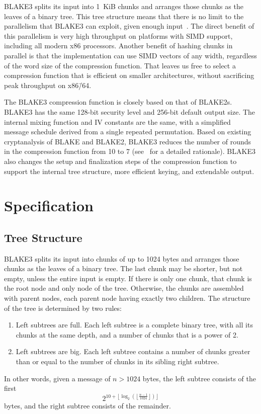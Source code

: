 \documentclass[11pt,notitlepage,a4paper]{article}
\begin{document}
BLAKE3 splits its input into 1~KiB chunks and arranges those chunks as the
leaves of a binary tree. This tree structure means that there is no limit to
the parallelism that BLAKE3 can exploit, given enough
input~\cite{DBLP:journals/tosc/AtighehchiB17,DBLP:journals/tc/AtighehchiR17}.
The direct benefit of this parallelism is very high throughput on platforms
with SIMD support, including all modern x86 processors. Another benefit of
hashing chunks in parallel is that the implementation can use SIMD vectors of
any width, regardless of the word size of the compression function. That leaves
us free to select a compression function that is efficient on smaller
architectures, without sacrificing peak throughput on x86\=/64.

The BLAKE3 compression function is closely based on that of BLAKE2s. BLAKE3 has
the same 128-bit security level and 256-bit default output size. The internal
mixing function and IV constants are the same, with a simplified message
schedule derived from a single repeated permutation. Based on existing
cryptanalysis of BLAKE and BLAKE2, BLAKE3 reduces the number of rounds in the
compression function from 10 to 7 (see~\cite{TMC} for a detailed rationale).
BLAKE3 also changes the setup and finalization steps of the compression
function to support the internal tree structure, more efficient keying, and
extendable output.

\section{Specification}\label{sec:specification}

\subsection{Tree Structure}\label{sec:tree}

BLAKE3 splits its input into chunks of up to 1024 bytes and arranges those
chunks as the leaves of a binary tree. The last chunk may be shorter, but not
empty, unless the entire input is empty. If there is only one chunk, that chunk
is the root node and only node of the tree. Otherwise, the chunks are assembled
with parent nodes, each parent node having exactly two children. The
structure of the tree is determined by two rules:
\begin{enumerate}
    \item Left subtrees are full. Each left subtree is a complete binary tree,
        with all its chunks at the same depth, and a number of chunks that is a
        power of 2.
    \item Left subtrees are big. Each left subtree contains a number of chunks
        greater than or equal to the number of chunks in its sibling right
        subtree.
\end{enumerate}
In other words, given a message of $n > 1024$ bytes, the left subtree consists of the first $$2^{10 + \left\lfloor \log_2 \left(\left\lfloor \frac{n-1}{1024} \right\rfloor\right) \right\rfloor}$$ bytes, and the right subtree consists of the remainder.
\end{document}
